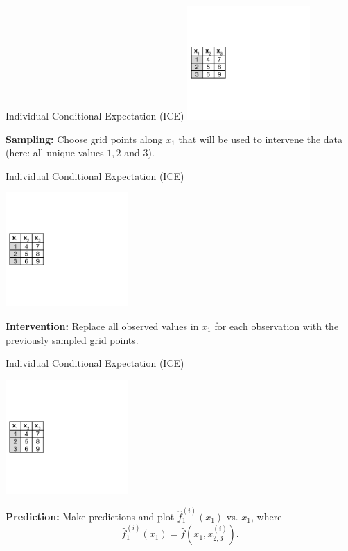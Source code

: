 \documentclass[aspectratio=169]{../latex_main/tntbeamer}  %
\begin{document}
\begin{frame}{Individual Conditional Expectation (ICE)}
\includegraphics[page=1, width=0.35\textwidth]{figure/ice_pd_plot_demo}

\textbf{Sampling:} Choose grid points along $x_1  $ that will be used to intervene the data (here: all unique values $1, 2$ and $3$).

\end{frame}
\begin{frame}{Individual Conditional Expectation (ICE)}

\includegraphics[page=2, width=0.35\textwidth]{figure/ice_pd_plot_demo}

\textbf{Intervention:} Replace all observed values in $x_1$ for each observation with the previously sampled grid points.

\end{frame}
\begin{frame}{Individual Conditional Expectation (ICE)}

\includegraphics[page=3, width=0.35\textwidth]{figure/ice_pd_plot_demo}

\textbf{Prediction:} Make predictions and plot $\hat{f}_{1}^{(i)}(x_1)$ vs. $x_1$, where $$\hat{f}_{1}^{(i)}(x_1) = \hat{f}(x_1, x^{(i)}_{2, 3}).$$

\end{frame}
\end{document}
